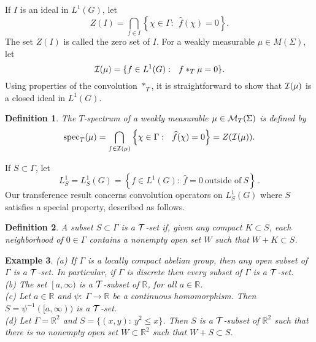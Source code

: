 \documentclass[12pt]{article}
\newcommand{\R}{\mathbb R}
\newcommand{\cT}{{\cal T}}
\newcommand{\cI}{{\cal I}}
\newcommand{\cMT}{{\cal M}_T(\Sigma)}
\newtheorem{defin}{Definition}[section]
\newtheorem{ex}[defin]{Example}
\begin{document}
If $I$ is an ideal in $L^1(G)$, let
$$Z(I)=\bigcap_{f\in I}
\left\{
\chi\in\Gamma:\ \ \widehat{f}(\chi)=0
\right\}.$$
The set $Z(I)$ is called the zero set of $I$.
For a weakly measurable $\mu\in M(\Sigma)$, let
$$\cI (\mu)=\{f\in L^1(G):\ \ f*_T\mu =0\}.$$
Using properties of the convolution $*_T$,
it is straightforward to show that $\cI(\mu)$ is a closed ideal
in $L^1(G)$.
\begin{defin}
The $T$-spectrum of a 
weakly measurable $\mu\in \cMT$ is defined by 
\begin{equation}
{\rm spec}_T (\mu)= \bigcap_{f\in \cI(\mu)}
\left\{
\chi\in\Gamma:\ \ \widehat{f}(\chi)=0
\right\}=Z(\cI(\mu)).
\label{specsbt}
\end{equation}
\label{Tspectrum}
\end{defin}
If $S\subset \Gamma$, let
$$L_S^1=L_S^1(G)=\left\{f\in L^1(G):\ \widehat{f}=0\ \mbox{outside of}\ S\right\}\,.$$
Our transference result concerns convolution operators on
$L^1_S(G)$ where $S$ satisfies
a special property, described as follows.
\begin{defin}
A subset $S\subset\Gamma$ is a $\cT$-set if, given any compact 
$K\subset S$, each neighborhood of $0\in\Gamma$ contains a nonempty open set
$W$ such that $W+K\subset S$. 
\label{t-set}
\end{defin}

\begin{ex}
{\rm (a)  If $\Gamma$ is a locally compact abelian group, then any open subset of $\Gamma$ is a $\cT$-set.  In particular, if $\Gamma$ is discrete then every subset of $\Gamma$ is a $\cT$-set.\\
(b)  The set $\left[ a,\infty\right. )$ is a $\cT$-subset of $\R$, for all $a\in\R$.  \\
(c)  Let $a\in\R$ and $\psi:\ \Gamma \rightarrow \R$ be a continuous homomorphism.  Then 
$S=\psi^{-1}([a,\infty))$ is a $\cT$-set.\\
(d)  Let $\Gamma=\R^2$ and $S=\{(x,y):\ y^2\leq x\}$.  
Then $S$ is a $\cT$-subset of $\R^2$ such that there is no nonempty open set $W\subset \R^2$ such that $W+S\subset S$. 
}
\end{ex}
\end{document}
